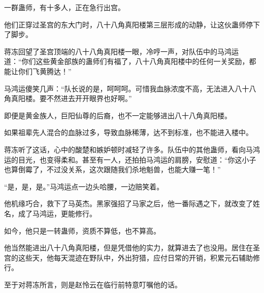 \begin{this_body}
一群蛊师，有十多人，正在急行出宫。

他们正穿过圣宫的东大门时，八十八角真阳楼第三层形成的动静，让这伙蛊师停下了脚步。

蒋冻回望了圣宫顶端的八十八角真阳楼一眼，冷哼一声，对队伍中的马鸿运道：“你们这些黄金部族的蛊师们有福了，八十八角真阳楼中的任何一关奖励，都能让你们飞黄腾达！”

马鸿运傻笑几声：“队长说的是，呵呵呵。可惜我血脉浓度不高，无法进入八十八角真阳楼。要不然进去开开眼界也好啊。”

即便是黄金族人，巨阳仙尊的后裔，也不一定能够进出八十八角真阳楼。

如果祖辈先人混合的血脉过多，导致血脉稀薄，达不到标准，也不能进入楼中。

蒋冻听了这话，心中的酸楚和嫉妒顿时减轻了许多。队伍中的其他蛊师，看向马鸿运的目光，也变得柔和。甚至有一人，还拍拍马鸿运的肩膀，安慰道：“你这小子也算倒霉了，不过没关系，这次跟随我们杀地魁兽，也能大赚一笔！”

“是，是，是。”马鸿运点一边头哈腰，一边赔笑着。

他机缘巧合，救下了马英杰。黑家强招了马家之后，他一番际遇之下，就改变了姓名，成了马鸿运，更能修行。

如今，他只是一转蛊师，资质不算低，也不算高。

他当然能进出八十八角真阳楼，但是凭借他的实力，就算进去了也没用。居住在圣宫的这些天，他每天混迹在野队中，外出狩猎，应付日常的开销，积累元石辅助修行。

至于对蒋冻所言，则是赵怜云在临行前特意叮嘱他的话。

\end{this_body}


